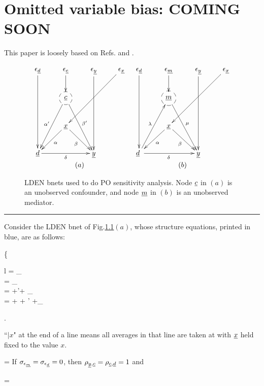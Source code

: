 \chapter{Omitted variable bias: COMING SOON}
\label{ch-omitted-var-bias}

This paper is
loosely based on Refs.\cite{cinelli-haz}
and \cite{cherno-cinelli}.


\begin{figure}[h!]
$$
\begin{array}{cc}
\xymatrix{
\eps_\rvd\ar[ddd]
&\eps_\rvc\ar[d]
&\eps_\rvy\ar[ddd]
&\eps_\rvx\ar[ddll]
\\
&*++[F-o]{\rvc}\ar[ldd]_{\alp'}
\ar[rdd]^{\beta'}
\\
&\rvx
\ar[ld]^\alp
\ar[rd]_\beta
\\
\rvd\ar[rr]_\delta
&&\rvy
}
&
\xymatrix{
\eps_\rvd\ar[ddd]
&\eps_\rvm\ar[d]
&\eps_\rvy\ar[ddd]
&\eps_\rvx\ar[ddll]
\\
&*++[F-o]{\rvm}
\ar[rdd]^{\mu}
\\
&\rvx
\ar[ld]^\alp
\ar[rd]_\beta
\\
\rvd\ar[rr]_\delta
\
\ar[ruu]^\lam
&&\rvy
}
\\
(a)&(b)
\end{array}
$$
\caption{LDEN bnets used to do PO
sensitivity analysis.
Node ${\underline{c}}$ in $(a)$
is an unobserved confounder,
and node ${\underline{m}}$ in $(b)$
is an unobserved mediator.}
\label{eq-ovb-sen-ana}
\end{figure}







\hrule
Consider the LDEN bnet of Fig.\ref{eq-ovb-sen-ana}$(a)$,
whose structure equations,
printed in blue, are as follows:

\beq
\color{blue}
\left\{
\begin{array}{l}
\rvc = \rveps_\rvc
\\
\rvx = \eps_\rvx
\\
\rvd = \alp\rvx +\alp'\rvc + \eps_\rvd
\\ 
\rvy = \delta \rvd +
\beta \rvx + \beta'\rvc
+\eps_\rvy
\end{array}
\right.
\eeq

\beq
{}
\eeq


``$|x$"
at the end of a line means 
all averages in that line are taken 
at with ${\underline{x}}$ held fixed to
the value $x$.

\begin{claim}
\beq
{}
=
\label{eq-bias-confounder}
\eeq
If $\sigma_{\epsilon_{\underline{m}}}=\sigma_{\epsilon_{\underline{d}}}=0$,
then $\rho_{{\underline{y}},{\underline{c}}}=\rho_{{\underline{c}}, {\underline{d}}}=1$
and  

\beq
{}
=
\eeq

\end{claim}
\proof


